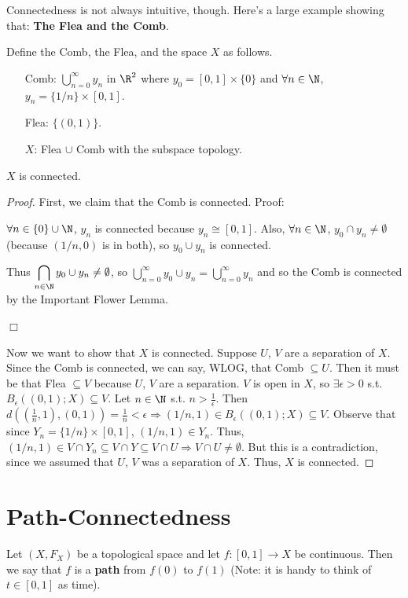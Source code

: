 Connectedness is not always intuitive, though.  Here's a large example showing that: \textbf{The Flea and the Comb}.

Define the Comb, the Flea, and the space $X$ as follows.
\begin{itemize}
\item[Comb:] ${\displaystyle\bigcup_{n=0}^{\infty}y_n}$ in $\R^2$ where $y_0 = [0,1]\times\{0\}$ and $\forall n\in \N$, $y_n = \{1/n\} \times [0,1]$.
\item[Flea:] $\{(0,1)\}$.
\item[$X$:]  Flea $\cup$ Comb with the subspace topology.
\end{itemize}

\begin{example} $X$ is connected. \end{example}
\begin{proof}
First, we claim that the Comb is connected.  Proof: 

$\forall n \in \{0\} \cup \N$, $y_n$ is connected because $y_n \cong [0,1]$.  Also, $\forall n \in \N$, $y_0 \cap y_n \neq \emptyset$  (because $(1/n, 0)$ is in both), so $y_0 \cup y_n$ is connected. 

Thus ${\displaystyle\bigcap_{n\in \N}y_0 \cup y_n} \neq \emptyset$,  so ${\displaystyle\bigcup_{n=0}^{\infty}y_0 \cup y_n} = {\displaystyle\bigcup_{n=0}^{\infty}y_n} $ and so the Comb is connected by the Important Flower Lemma. \begin{flushright}$\Box$\end{flushright}

Now we want to show that $X$ is connected.  Suppose $U$, $V$ are a separation of $X$. Since the Comb is connected, we can say, WLOG, that Comb $\subseteq U$. Then it must be that Flea $\subseteq V$ because $U$, $V$ are a separation. $V$ is open in $X$, so $\exists \epsilon > 0$ s.t. $B_{\epsilon}((0,1); X) \subseteq V$. Let $n \in \N$ s.t. $n > \frac{1}{\epsilon}$. Then $d((\frac{1}{n}, 1), (0, 1)) = \frac{1}{n} < \epsilon \Rightarrow (1/n, 1) \in B_{\epsilon}((0,1); X) \subseteq V$. Observe that since $Y_n = \{1/n\} \times [0,1]$,  $(1/n, 1) \in Y_n$. Thus, $(1/n, 1) \in V \cap Y_n \subseteq V \cap Y \subseteq V \cap U \Rightarrow V \cap U \neq \emptyset$. But this is a contradiction, since we assumed that $U$, $V$ was a separation of $X$. Thus, $X$ is connected.
\end{proof}

\section{Path-Connectedness}
\begin{definition} Let $(X, F_X)$ be a topological space and let $f:[0,1] \rightarrow X$ be continuous. Then we say that $f$ is a \textbf{path} from $f(0)$ to $f(1)$ (Note: it is handy to think of $t \in [0,1]$ as time).
\end{definition}

